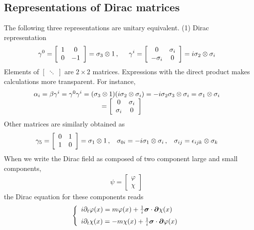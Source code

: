 \subsection{Representations of Dirac matrices}
The following three representations are unitary equivalent.
(1) Dirac representation\\
\begin{eqnarray}
\gamma^0
=
\left[
\begin{array}{cc}
1 & 0 \\ 0 & -1
\end{array}
\right]
= \sigma_3 \otimes 1
\,,
\hspace{5mm}
\gamma^i
=
\left[
\begin{array}{cc}
0 & \sigma_i \\ -\sigma_i & 0
\end{array}
\right]
=
i\sigma_2 \otimes \sigma_i
\end{eqnarray}
Elements of $\left[\;\ddots\;\right]$ are $2 \times 2$ matrices.
Expressions with the direct product makes calculations more transparent. 
For instance,
\begin{eqnarray}
\begin{array}{l}
\alpha_i = \beta \gamma^i = \gamma^0 \gamma^i
= (\sigma_3 \otimes 1)(i\sigma_2 \otimes \sigma_i)
= -i \sigma_2 \sigma_3 \otimes \sigma_i
= \sigma_1 \otimes \sigma_i
\\
\hspace{35mm}
=
\left[
\begin{array}{cc}
0 & \sigma_i
\\
\sigma_i & 0
\end{array}
\right]
\end{array}
\end{eqnarray}
Other matrices are similarly obtained as
\begin{eqnarray}
\gamma_5
=
\left[
\begin{array}{cc}
0 & 1 \\ 1 & 0
\end{array}
\right]
= \sigma_1 \otimes 1\,,
\hspace{3mm}
\sigma_{0 i} = -i  \sigma_1 \otimes \sigma_i\,,
\hspace{3mm}
\sigma_{i j} = \epsilon_{ijk} \otimes \sigma_k
\end{eqnarray}
When we write the Dirac field as composed of two component 
large and small components,
\begin{eqnarray}
\psi =
\left[
\begin{array}{c}
\varphi \\ \chi
\end{array}
\right]\,
\end{eqnarray}
the Dirac equation for these components reads
\begin{eqnarray}
\left\{
\begin{array}{l}
i \partial_t \varphi(x)
=
m \varphi(x) + \frac{1}{i} \bld{\sigma} \cdot \bld{\partial} \chi(x)
\vspace{2mm}
\\
i \partial_t \chi(x)
=
-m \chi(x) + \frac{1}{i} \bld{\sigma} \cdot \bld{\partial} \varphi(x)
\end{array}
\right.
\end{eqnarray}
\\

